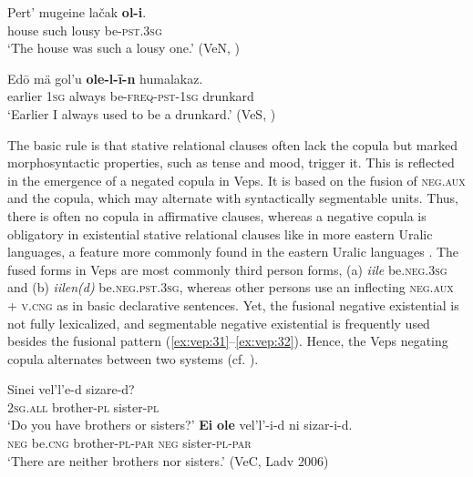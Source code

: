 \documentclass[output=paper,colorlinks=true, citecolor=brown]{langscibook}
\begin{document}
\ea
    \label{ex:vep:29}
    \gll  Pert' mugeine lačak \textbf{ol-i}. \\
         house such lousy be-\textsc{pst}.\textsc{3sg} \\
    \glt ‘The house was such a lousy one.’ (VeN, \citealt[72]{MSFOu86})
\z

\ea
    \label{ex:vep:30}
    \gll Edō mä gol'u \textbf{ole-l-ī-n} humalakaz. \\
         earlier \textsc{1sg} always be-\textsc{freq}-\textsc{pst}{}-\textsc{1sg} drunkard\\
    \glt ‘Earlier I always used to be a drunkard.’ (VeS, \citealt[74]{MSFOu86})
\z 

The basic rule is that stative relational clauses often lack the copula but marked morphosyntactic properties, such as tense and mood, trigger it. This is reflected in the emergence of a negated copula in Veps. It is based on the fusion of \textsc{neg.aux} and the copula, which may alternate with syntactically segmentable units. Thus, there is often no copula in affirmative clauses, whereas a negative copula is obligatory in existential stative relational clauses like in more eastern Uralic languages,
a feature more commonly found in the eastern Uralic languages \citep{Veselinova2015}. The fused forms in Veps are most commonly third person forms, (a) \textit{iile} be.\textsc{neg.3sg} and (b) \textit{iilen(d)} be.\textsc{neg}.\textsc{pst}.\textsc{3sg}, whereas other persons use an inflecting \textsc{neg.aux} + \textsc{v.cng} as in basic declarative sentences. Yet, the fusional negative existential is not fully lexicalized, and segmentable negative existential is frequently used besides the fusional pattern (\ref{ex:vep:31}–\ref{ex:vep:32}). Hence, the Veps negating copula alternates between two systems (cf. \citealt{Veselinova2014}).

\ea\label{ex:vep:31}%
    \ea\label{ex:vep:31a}
        \gll  Sinei vel’l’e-d sizare-d? \\ 
              \textsc{2sg.all} brother{}-\textsc{pl} sister{}-\textsc{pl}\\
        \glt ‘Do you have brothers or sisters?’
    \ex\label{ex:vep:31b}
        \gll  \textbf{Ei} \textbf{ole} vel’l’-i-d  ni sizar-i-d. \\
              \textsc{neg} be.\textsc{cng} brother{}-\textsc{pl}{}-\textsc{par} \textsc{neg} sister{}-\textsc{pl}{}-\textsc{par}\\
        \glt ‘There are neither brothers nor sisters.’ (VeC, Ladv 2006)
    \z
\z 
\end{document}
